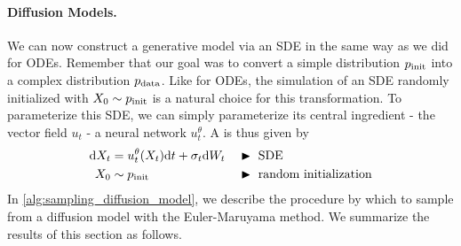 \paragraph{Diffusion Models.} We can now construct a generative model via an SDE in the same way as we did for ODEs. Remember that our goal was to convert a simple distribution $p_{\rm{init}}$ into a complex distribution $p_{\rm{data}}$. Like for ODEs, the simulation of an SDE randomly initialized with $X_0\sim p_{\rm{init}}$ is a natural choice for this transformation. To parameterize this SDE, we can simply parameterize its central ingredient - the vector field $u_t$ - a neural network $u_t^\theta$. A  is thus given by
\begin{align*}
    \mathrm{d} X_t &= u_t^\theta(X_t)\mathrm{d} t + \sigma_t \mathrm{d} W_t &&\blacktriangleright\,\,\text{SDE}\\
    X_0 &\sim p_{\rm{init}}  &&\blacktriangleright\,\,\text{random initialization}
    \end{align*}
In \cref{alg:sampling_diffusion_model}, we describe the procedure by which to sample from a diffusion model with the Euler-Maruyama method. We summarize the results of this section as follows.

